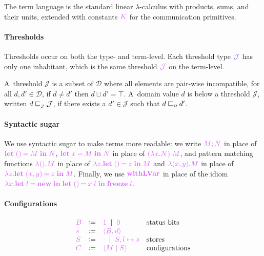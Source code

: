 \documentclass[main.tex]{subfiles}
\begin{document}
The term language is the standard linear $\lambda$-calculus with products, sums, and their units, extended with constants $\tm{K}$ for the communication primitives. 

\paragraph*{Thresholds}
Thresholds occur on both the type- and term-level. Each threshold type $\tyJ$ has only one inhabitant, which is the same threshold $\tmJ$ on the term-level.

A~threshold $\mathcal{J}$ is a subset of $\mathcal{D}$ where all elements are pair-wise incompatible, \ie for all $d,d'\in\mathcal{D}$, if ${d}\neq{d'}$ then ${d}\sqcup{d'}={\top}$.
A~domain value $d$ is below a threshold $\mathcal{J}$, written ${d}\mathbin{{\color{black}\sqsubseteq_{\scriptscriptstyle\mathcal{J}}}}\mathcal{J}$, if there exists a ${d'}\in\mathcal{J}$ such that ${d}\mathbin{{\color{black}\sqsubseteq_{\scriptscriptstyle\mathcal{D}}}}{d'}$.

\paragraph*{Syntactic sugar}
We use syntactic sugar to make terms more readable: we write $\tm{\andthen{M}{N}}$ in place of $\tm{\letunit{M}{N}}$, $\tm{\letbind{x}{M}{N}}$ in place of $\tm{(\lambda x.N)\;M}$, and pattern matching functions $\tm{\lambda\unit.M}$ in place of $\tm{\lambda z.\letunit{z}{M}}$ and $\tm{\lambda\pair{x}{y}.M}$ in place of $\tm{\lambda z.\letpair{x}{y}{z}{M}}$. Finally, we use $\tm{\lvarrun}$ in place of the idiom $\tm{\lambda x.\letbind{l}{\lvarnew}{\letunit{x\;l}{\lvarfreeze\;l}}}$.

\paragraph*{Configurations}
\[
\begin{array}{lrll}
  \tm{B}
  & \coloneqq & \tm{1}
    \sep        \tm{0} & \text{status bits}
  \\
  \tm{s}
  & \coloneqq & \tm{\langle B, d \rangle}
  \\
  \tm{S}
  & \coloneqq & \tm{\emptyenv}
    \sep        \tm{S, l \mapsto s} & \text{stores}
  \\
  \tm{C}
  & \coloneqq & \tm{\config{M}{S}} & \text{configurations}
\end{array}
\]
\end{document}

